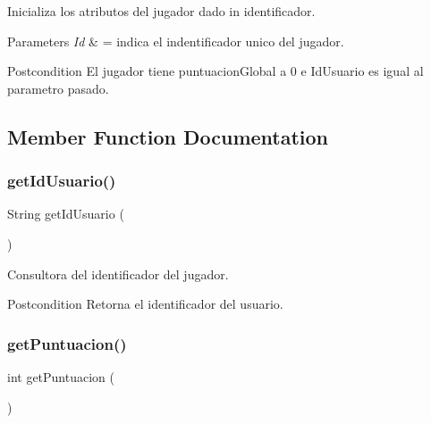 Inicializa los atributos del jugador dado in identificador. 


\begin{DoxyParams}{Parameters}
{\em Id} & = indica el indentificador unico del jugador. \\
\hline
\end{DoxyParams}
\begin{DoxyPostcond}{Postcondition}
El jugador tiene puntuacion\+Global a 0 e Id\+Usuario es igual al parametro pasado. 
\end{DoxyPostcond}


\subsection{Member Function Documentation}
\mbox{\label{class_dominio_1_1clases_1_1_jugador_a3587469ee0c534c0310faa28f88e281a}} 
\subsubsection{get\+Id\+Usuario()}
{\footnotesize\ttfamily String get\+Id\+Usuario (\begin{DoxyParamCaption}{ }\end{DoxyParamCaption})\hspace{0.3cm}{\ttfamily [inline]}}



Consultora del identificador del jugador. 

\begin{DoxyPostcond}{Postcondition}
Retorna el identificador del usuario. 
\end{DoxyPostcond}
\mbox{\label{class_dominio_1_1clases_1_1_jugador_aa609c6b362a33afde83f83a5774c52a2}} 
\subsubsection{get\+Puntuacion()}
{\footnotesize\ttfamily int get\+Puntuacion (\begin{DoxyParamCaption}{ }\end{DoxyParamCaption})\hspace{0.3cm}{\ttfamily [inline]}}



